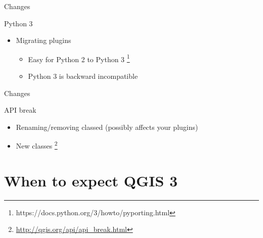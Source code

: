 \begin{frame}{Changes}
	\begin{block}{Python 3}
		\begin{itemize}
			\item Migrating plugins
			\begin{itemize}
				\item Easy for Python 2 to Python 3 \footnote{https://docs.python.org/3/howto/pyporting.html}
				\item Python 3 is backward incompatible
			\end{itemize}
		\end{itemize}
	\end{block}
\end{frame}

\begin{frame}{Changes}
	\begin{block}{API break}
		\begin{itemize}
			\item Renaming/removing classed (possibly affects your plugins)
			\item New classes \footnote{\href{http://qgis.org/api/api_break.html}{http://qgis.org/api/api\_break.html}}
		\end{itemize}
	\end{block}
\end{frame}

\section{When to expect QGIS 3}
